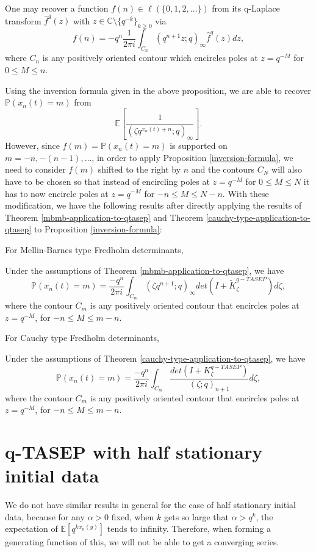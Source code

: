 \begin{proposition}
\label{inversion-formula}
One may recover a function $f(n) \in \ell(\{0,1,2,\dots \})$ from its q-Laplace transform $\hat{f}^q(z)$ with $z \in \mathbb{C} \setminus \{q^{-k}\}_{k \ge 0}$ via
$$f(n) = -q^n \frac{1}{2 \pi i} \int_{C_n} (q^{n+1}z; q)_{\infty} \hat{f}^q(z) dz,$$ 
where $C_n$ is any positively oriented contour which encircles poles at $z = q^{-M}$ for $0 \le M \le n$.
\end{proposition}

Using the inversion formula given in the above proposition, we are able to recover $\mathbb{P}(x_n(t) = m)$ from $$\mathbb{E}\left[ \frac{1}{(\zeta q^{x_n(t) + n}; q)_{\infty}} \right].$$ However, since $f(m) = \mathbb{P}(x_n(t) = m)$ is supported on $m = -n, -(n-1), \dots$, in order to apply Proposition \ref{inversion-formula}, we need to consider $f(m)$ shifted to the right by $n$ and the contours $C_N$ will also have to be chosen so that instead of encircling poles at $z = q^{-M}$ for $0 \le M \le N$ it has to now encircle poles at $z = q^{-M}$ for $-n \le M \le N-n$. With these modification, we have the following results after directly applying the results of Theorem \ref{mbmb-application-to-qtasep} and Theorem \ref{cauchy-type-application-to-qtasep} to Proposition \ref{inversion-formula}:

For Mellin-Barnes type Fredholm determinants, 
\begin{proposition}
Under the assumptions of Theorem \ref{mbmb-application-to-qtasep}, we have $$\mathbb{P}(x_n(t) = m) = \frac{-q^n}{2 \pi i} \int_{C_m} (\zeta q^{n+1}; q)_{\infty} det(I+\tilde{K}_{\zeta}^{q-TASEP}) d\zeta,$$ where the contour $C_m$ is any positively oriented contour that encircles poles at $z = q^{-M}$, for $-n \le M \le m-n$.
\end{proposition}

For Cauchy type Fredholm determinants, 
\begin{proposition}
Under the assumptions of Theorem \ref{cauchy-type-application-to-qtasep}, we have $$\mathbb{P}(x_n(t) = m) = \frac{-q^n}{2 \pi i} \int_{C_m} \frac{det(I+K_{\zeta}^{q-TASEP})}{(\zeta;q)_{n+1}} d\zeta,$$ where the contour $C_m$ is any positively oriented contour that encircles poles at $z = q^{-M}$, for $-n \le M \le m-n$.
\end{proposition}
\section{q-TASEP with half stationary initial data}
We do not have similar results in general for the case of half stationary initial data, because for any $\alpha > 0$ fixed, when $k$ gets so large that $\alpha > q^k$, the expectation of $\mathbb{E} \left[ q^{kx_n(y)} \right]$ tends to infinity. Therefore, when forming a generating function of this, we will not be able to get a converging series. 